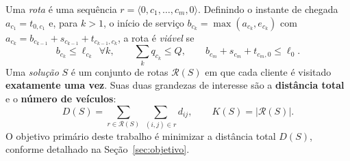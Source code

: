 \documentclass[12pt, a4paper]{article}
\begin{document}
Uma \emph{rota} é uma sequência $r=\langle 0, c_1, \dots, c_m, 0\rangle$. Definindo o instante de chegada $a_{c_1}=t_{0,c_1}$ e, para $k>1$, o início de serviço $b_{c_{k}}=\max(a_{c_k},e_{c_k})$ com $a_{c_{k}}=b_{c_{k-1}}+s_{c_{k-1}}+t_{c_{k-1},c_k}$, a rota é \emph{viável} se
\begin{equation}
b_{c_k}\le \ell_{c_k}\ \ \forall k,\qquad
\sum_{k} q_{c_k}\le Q,\qquad
b_{c_m}+s_{c_m}+t_{c_m,0}\le \ell_0 .
\label{eq:viab}
\end{equation}
Uma \emph{solução} $S$ é um conjunto de rotas $\mathcal{R}(S)$ em que cada cliente é visitado \textbf{exatamente uma vez}. Suas duas grandezas de interesse são a \textbf{distância total} e o \textbf{número de veículos}:
\begin{equation}
D(S)=\sum_{r\in\mathcal{R}(S)}\ \sum_{(i,j)\in r} d_{ij},
\qquad
K(S)=|\mathcal{R}(S)|.
\label{eq:defs}
\end{equation}
O objetivo primário deste trabalho é minimizar a distância total $D(S)$, conforme detalhado na Seção~\ref{sec:objetivo}.
\end{document}
